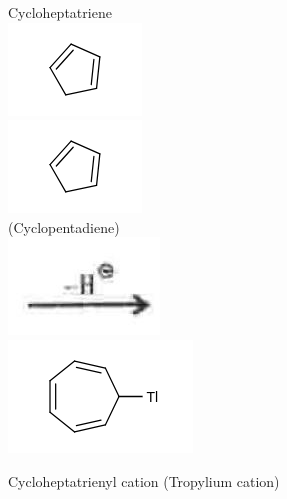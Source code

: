 \documentclass[10pt]{article}
\begin{document}
Cycloheptatriene\\
\includegraphics{smile-3bf46aa79982ad60a50cd8ea2a29d2243e54cc35}\\
\includegraphics{smile-9478424e63cfc12ff0b771c3a0ca485211d075c3}\\
(Cyclopentadiene)\\
\includegraphics[max width=\textwidth, center]{2025_01_28_8470952b98110cec3aabg-201}\\
\includegraphics{smile-db71afc3b852f28d2f5fae67cb1812d4e34db68d}

Cycloheptatrienyl cation (Tropylium cation)
\end{document}
